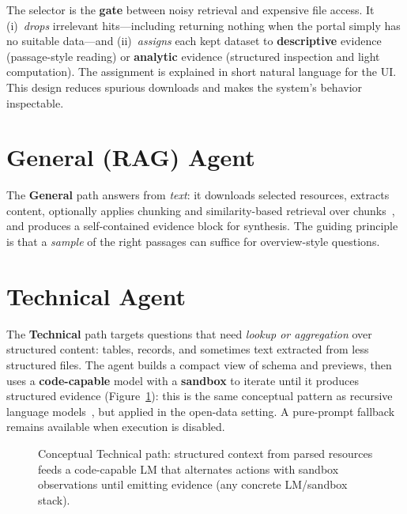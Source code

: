 \documentclass[sigconf,anonymous]{acmart}
\begin{document}
The selector is the \textbf{gate} between noisy retrieval and expensive file access. It (i)~\emph{drops} irrelevant hits---including returning nothing when the portal simply has no suitable data---and (ii)~\emph{assigns} each kept dataset to \textbf{descriptive} evidence (passage-style reading) or \textbf{analytic} evidence (structured inspection and light computation). The assignment is explained in short natural language for the UI. This design reduces spurious downloads and makes the system's behavior inspectable.

\section{General (RAG) Agent}
\label{sec:general}

The \textbf{General} path answers from \emph{text}: it downloads selected resources, extracts content, optionally applies chunking and similarity-based retrieval over chunks~\cite{yepes2024chunking, qu2024semantic, chen2024dense}, and produces a self-contained evidence block for synthesis. The guiding principle is that a \emph{sample} of the right passages can suffice for overview-style questions.

\section{Technical Agent}
\label{sec:technical}

The \textbf{Technical} path targets questions that need \emph{lookup or aggregation} over structured content: tables, records, and sometimes text extracted from less structured files. The agent builds a compact view of schema and previews, then uses a \textbf{code-capable} model with a \textbf{sandbox} to iterate until it produces structured evidence (Figure~\ref{fig:rlm-code}): this is the same conceptual pattern as recursive language models~\cite{zhang2025rlm}, but applied in the open-data setting. A pure-prompt fallback remains available when execution is disabled.

\begin{figure}[t]
  \centering
  \resizebox{0.92\columnwidth}{!}{}
  \caption{Conceptual Technical path: structured context from parsed resources feeds a code-capable LM that alternates actions with sandbox observations until emitting evidence (any concrete LM/sandbox stack).}
  \label{fig:rlm-code}
\end{figure}
\end{document}
